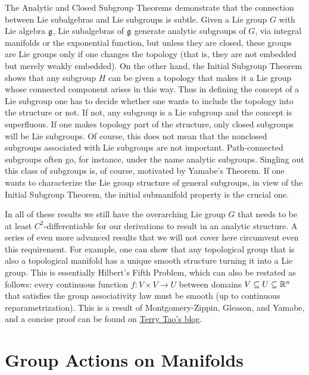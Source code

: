 The Analytic and Closed Subgroup Theorems demonstrate that the connection between Lie subalgebras and Lie subgroups is subtle. Given a Lie group $G$ with Lie algebra $\mathfrak{g}$, Lie subalgebras of $\mathfrak{g}$ generate analytic subgroups of $G$, via integral manifolds or the exponential function, but unless they are closed, these groups are Lie groups only if one changes the topology (that is, they are not embedded but merely weakly embedded). On the other hand,  the Initial Subgroup Theorem shows that any subgroup $H$ can be given a topology that makes it a Lie group whose connected component arises in this way. Thus in defining the concept of a Lie subgroup one has to decide whether one wants to include the topology into the structure or not. If not, any subgroup is a Lie subgroup and the concept is superfluous. If one makes topology part of the structure, only closed subgroups will be Lie subgroups. Of course, this does not mean that the nonclosed subgroups associated with Lie subgroups are not important. Path-connected subgroups often go, for instance, under the name analytic subgroups. Singling out this class of subgroups is, of course, motivated by Yamabe's Theorem. If one wants to characterize the Lie group structure of general subgroups, in view of the Initial Subgroup Theorem, the initial submanifold property is the crucial one.

In all of these results we still have the overarching Lie group $G$ that needs to be at least $C^2$-differentiable for our derivations to result in an analytic structure. A series of even more advanced results that we will not cover here circumvent even this requirement. For example, one can show that any topological group that is also a topological manifold has a unique smooth structure turning it into a Lie group. This is essentially Hilbert's Fifth Problem, which can also be restated as follows: every continuous function $f:V\times V\to U$ between domains $V\subseteq U\subseteq \mathbb{R}^n$ that satisfies the group associativity law must be smooth (up to continuous reparametrization). This is a result of Montgomery-Zippin, Gleason, and Yamabe, and a concise proof can be found on \href{https://terrytao.wordpress.com/2011/06/17/hilberts-fifth-problem-and-gleason-metrics/}{Terry Tao's blog}.








\clearpage
\section{Group Actions on Manifolds}


